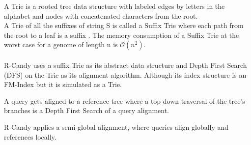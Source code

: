 \documentclass[11pt,a4paper]{report}
\begin{document}
A Trie is a rooted tree data structure with labeled edges 
by letters in the alphabet and nodes with concatenated 
characters from the root\cite{trie}.\\ 
A Trie of all the suffixes of string S is called a Suffix 
Trie where each path from the root to a leaf is a suffix 
\cite{gusfield1997algorithms}.
The memory consumption of a Suffix Trie at the worst case 
for a genome of length n is  $\mathcal{O} (n^{2})$.
\\\\

R-Candy uses a suffix Trie as its abstract data structure
and Depth First Search (DFS) on the Trie as its alignment algorithm.
Although its index structure is an FM-Index but it is simulated as a Trie.

A query gets aligned to a reference tree where a top-down traversal
of the tree's branches is a Depth First Search of a query alignment.

R-Candy applies a semi-global alignment, where queries 
align globally and  references locally.
\end{document}
